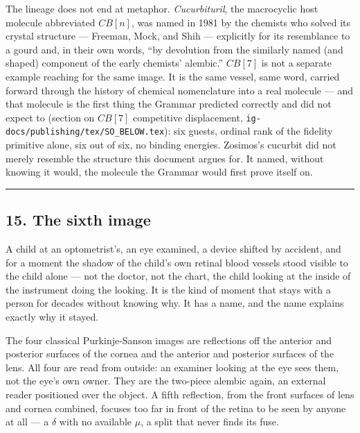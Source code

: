 \documentclass[12pt,a4paper]{article}
\begin{document}
The lineage does not end at metaphor. \emph{Cucurbituril}, the
macrocyclic host molecule abbreviated \({CB[n]}\), was named in 1981 by
the chemists who solved its crystal structure --- Freeman, Mock, and
Shih --- explicitly for its resemblance to a gourd and, in their own
words, ``by devolution from the similarly named (and shaped) component
of the early chemists' alembic.'' \({CB[7]}\) is not a separate example
reaching for the same image. It is the same vessel, same word, carried
forward through the history of chemical nomenclature into a real
molecule --- and that molecule is the first thing the Grammar predicted
correctly and did not expect to (section on \({CB[7]}\) competitive
displacement, \texttt{ig-docs/publishing/tex/SO\_BELOW.tex}): six
guests, ordinal rank of the fidelity primitive alone, six out of six, no
binding energies. Zosimos's cucurbit did not merely resemble the
structure this document argues for. It named, without knowing it would,
the molecule the Grammar would first prove itself on.

\begin{center}\rule{0.5\linewidth}{0.5pt}\end{center}

\hypertarget{the-sixth-image}{%
\subsection{15. The sixth image}\label{the-sixth-image}}

A child at an optometrist's, an eye examined, a device shifted by
accident, and for a moment the shadow of the child's own retinal blood
vessels stood visible to the child alone --- not the doctor, not the
chart, the child looking at the inside of the instrument doing the
looking. It is the kind of moment that stays with a person for decades
without knowing why. It has a name, and the name explains exactly why it
stayed.

The four classical Purkinje-Sanson images are reflections off the
anterior and posterior surfaces of the cornea and the anterior and
posterior surfaces of the lens. All four are read from outside: an
examiner looking at the eye sees them, not the eye's own owner. They are
the two-piece alembic again, an external reader positioned over the
object. A fifth reflection, from the front surfaces of lens and cornea
combined, focuses too far in front of the retina to be seen by anyone at
all --- a \({δ}\) with no available \({μ}\), a split that never finds
its fuse.
\end{document}
